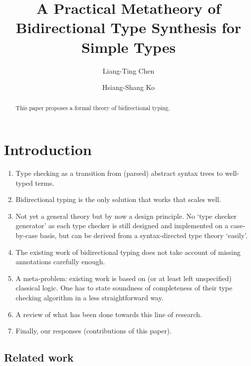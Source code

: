 \documentclass[acmsmall,screen]{acmart}
\theoremstyle{acmdefinition}
\begin{document}
\author{Liang-Ting Chen}
\author{Hsiang-Shang Ko}


\title{A Practical Metatheory of Bidirectional Type Synthesis for Simple Types}

\begin{abstract}
  This paper proposes a formal theory of bidirectional typing.
\end{abstract}

\maketitle

\section{Introduction}\label{sec:intro}

\begin{enumerate}
  \item Type checking as a transition from (parsed) abstract syntax trees to well-typed terms.
  \item Bidirectional typing is the only solution that works that scales well.
  \item Not yet a general theory but by now a design principle.
    No `type checker generator' as each type checker is still designed and implemented on a case-by-case basis, but can be derived from a syntax-directed type theory `easily'.
  \item The existing work of bidirectional typing does not take account of missing annotations carefully enough. 
  \item A meta-problem: existing work is based on (or at least left unspecified) classical logic.
    One has to state soundness of completeness of their type checking algorithm in a less straightforward way.
  \item A review of what has been done towards this line of research.
  \item Finally, our responses (contributions of this paper).
\end{enumerate}

\subsection{Related work}
\end{document}
